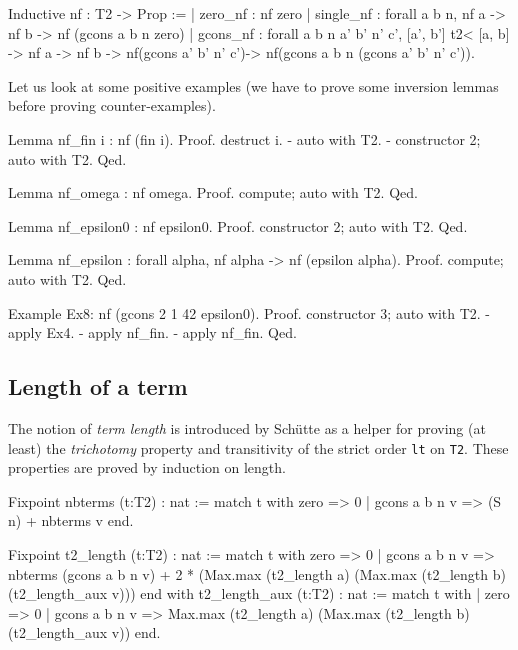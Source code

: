 {\begin{Coqsrc}
Inductive nf : T2 -> Prop :=
| zero_nf : nf zero
| single_nf : forall a b n, nf a ->  nf b -> nf (gcons a b n zero)
| gcons_nf : forall a b n a' b' n' c', 
                      [a', b'] t2< [a, b]  -> 
                      nf a -> nf b -> 
                      nf(gcons a' b' n' c')-> 
                      nf(gcons a b n (gcons a' b' n' c')).
\end{Coqsrc}

Let us look at some positive examples (we have to prove some inversion lemmas before proving counter-examples).


\begin{Coqsrc}
Lemma  nf_fin i : nf (fin i).
Proof.
  destruct i.
  - auto with T2.
  - constructor 2; auto with T2.
Qed.

Lemma nf_omega : nf omega.
Proof.  compute; auto with T2. Qed.

Lemma nf_epsilon0 : nf epsilon0.
Proof. constructor 2; auto with T2. Qed.

Lemma nf_epsilon : forall alpha, nf alpha -> nf (epsilon alpha).
Proof. compute; auto with T2. Qed.

Example Ex8: nf (gcons 2 1 42 epsilon0).
Proof.
  constructor 3; auto with T2.
  - apply Ex4.
  - apply nf_fin.
  - apply nf_fin.
Qed.
\end{Coqsrc}


\subsection{Length of a term}

The notion of \emph{term length} is introduced by Schütte as a helper for proving (at least) the \emph{trichotomy} property and transitivity of the strict order \texttt{lt} on \texttt{T2}. These properties are proved by induction on length.

\begin{Coqsrc}
Fixpoint nbterms (t:T2) : nat :=
  match t with zero => 0
             | gcons a b n v => (S n) + nbterms v
  end.

Fixpoint t2_length (t:T2) : nat :=
  match t  with 
    zero => 0
  | gcons a b n v => 
       nbterms (gcons a b n v) + 
      2 * (Max.max (t2_length a)
                              (Max.max (t2_length b) 
                                                (t2_length_aux v)))
  end
with t2_length_aux (t:T2) : nat :=
 match t with 
 | zero => 0
  | gcons a b n v =>
           Max.max (t2_length a) 
                            (Max.max (t2_length b) (t2_length_aux v))
 end.
\end{Coqsrc}

}

